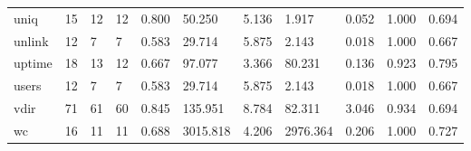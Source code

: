 \begin{longtable}{lp{1.2cm}p{1.2cm}p{1.2cm}p{1.2cm}p{1.2cm}p{1.2cm}p{1.2cm}p{1.2cm}p{1.2cm}p{1.2cm}}
uniq      &                           15 &                 12 &                                12 &                                      0.800 &                                 50.250 &                                        5.136 &                             1.917 &                                   0.052 &                              1.000 &                                              0.694 \\
unlink    &                           12 &                  7 &                                 7 &                                      0.583 &                                 29.714 &                                        5.875 &                             2.143 &                                   0.018 &                              1.000 &                                              0.667 \\
uptime    &                           18 &                 13 &                                12 &                                      0.667 &                                 97.077 &                                        3.366 &                            80.231 &                                   0.136 &                              0.923 &                                              0.795 \\
users     &                           12 &                  7 &                                 7 &                                      0.583 &                                 29.714 &                                        5.875 &                             2.143 &                                   0.018 &                              1.000 &                                              0.667 \\
vdir      &                           71 &                 61 &                                60 &                                      0.845 &                                135.951 &                                        8.784 &                            82.311 &                                   3.046 &                              0.934 &                                              0.694 \\
wc        &                           16 &                 11 &                                11 &                                      0.688 &                               3015.818 &                                        4.206 &                          2976.364 &                                   0.206 &                              1.000 &                                              0.727 \\

\end{longtable}

